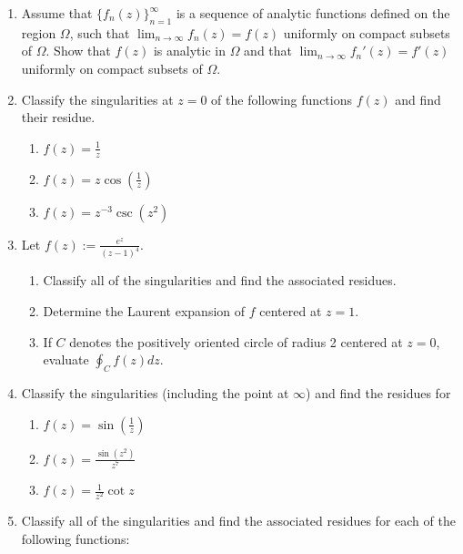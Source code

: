 \documentclass[a4paper,10pt]{article}
\begin{document}
\begin{enumerate}
 	\item Assume that $\{f_n(z)\}_{n = 1}^{\infty}$ is a sequence of analytic functions defined on the region $\Omega$, such that $\lim_{n \to \infty} f_n(z) = f(z)$ uniformly on compact subsets of $\Omega$. Show that $f(z)$ is analytic in $\Omega$ and that $\lim_{n \to \infty} f_n'(z) = f'(z)$ uniformly on compact subsets of $\Omega$.
 	
 	\item Classify the singularities at $z = 0$ of the following functions $f(z)$ and find their residue.
 	
 	\begin{enumerate}
 		\item $f(z) = \frac{1}{z}$
 		
 		\item $f(z) = z \cos \left( \frac{1}{z} \right)$
 		
 		\item $f(z) = z^{-3} \csc(z^2)$
 	\end{enumerate}
 	
 	\item Let $f(z):= \frac{e^z}{(z - 1)^4}$.
 	
 	\begin{enumerate}
 		\item Classify all of the singularities and find the associated residues.
 		
 		\item Determine the Laurent expansion of $f$ centered at $z = 1$.
 		
 		\item If $C$ denotes the positively oriented circle of radius 2 centered at $z = 0$, evaluate $\oint_C f(z) dz$.
 	\end{enumerate}
 	
 	\item Classify the singularities (including the point at $\infty$) and find the residues for
 	
 	\begin{enumerate}
 		\item $f(z) = \sin \left( \frac{1}{z} \right)$
 		
 		\item $f(z) = \frac{\sin(z^2)}{z^7}$
 		
 		\item $f(z) = \frac{1}{z^2} \cot z$
 	\end{enumerate}
 	
 	\item Classify all of the singularities and find the associated residues for each of the following functions:
 	

\end{enumerate}
\end{document}
